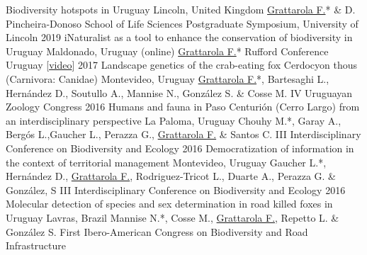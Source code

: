 \documentclass[9pt]{developercv} %
\begin{document}
\begin{entrylist}
		{Biodiversity hotspots in Uruguay}
		{Lincoln, United Kingdom}
		{\underline{Grattarola F.}* \& D. Pincheira-Donoso \slashsep School of Life Sciences Postgraduate Symposium, University of Lincoln}
	\entrylong
		{2019}
		{iNaturalist as a tool to enhance the conservation of biodiversity in Uruguay}
		{Maldonado, Uruguay (online)}
		{\underline{Grattarola F.}* \slashsep Rufford Conference Uruguay  [\href{https://youtu.be/3_lM-gPNLWY}{video}]}
	\entrylong
		{2017}
		{Landscape genetics of the crab-eating fox Cerdocyon thous (Carnivora: Canidae)}
		{Montevideo, Uruguay}
		{\underline{Grattarola F.}*, Bartesaghi L., Hernández D., Soutullo A., Mannise N., González S. \& Cosse M. \slashsep IV Uruguayan Zoology Congress}
	\entrylong
		{2016}
		{Humans and fauna in Paso Centurión (Cerro Largo) from an interdisciplinary perspective}
		{La Paloma, Uruguay}
		{Chouhy M.*, Garay A., Bergós L.,Gaucher L., Perazza G., \underline{Grattarola F.} \& Santos C. \slashsep III Interdisciplinary Conference on Biodiversity and Ecology}
	\entrylong
		{2016}
		{Democratization of information in the context of territorial management}
		{Montevideo, Uruguay}
		{Gaucher L.*, Hernández D., \underline{Grattarola F.}, Rodriguez-Tricot L., Duarte A., Perazza G. \& González, S \slashsep III Interdisciplinary Conference on Biodiversity and Ecology}
	\entrylong
		{2016}
		{Molecular detection of species and sex determination in road killed foxes in Uruguay}
		{Lavras, Brazil}
		{Mannise N.*, Cosse M., \underline{Grattarola F.}, Repetto L. \& González S. \slashsep First Ibero-American Congress on Biodiversity and Road Infrastructure}		
\end{entrylist}


\end{document}
